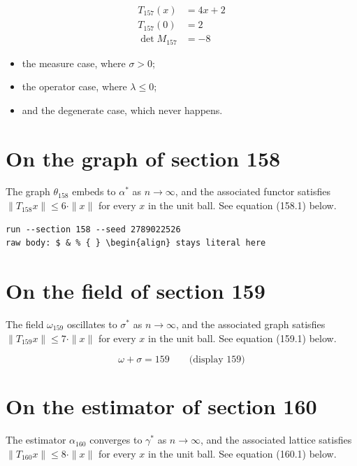 \documentclass{article}
\begin{document}
\begin{align}
T_{157}(x) &= 4 x + 2 \\
T_{157}(0) &= 2 \\
\det M_{157} &= -8
\end{align}

\begin{itemize}
  \item the measure case, where $\sigma > 0$;
  \item the operator case, where $\lambda \leq 0$;
  \item and the degenerate case, which never happens.
\end{itemize}

\section{On the graph of section 158}
The graph $\theta_{158}$ embeds to $\alpha^{*}$ as $n \to \infty$,
and the associated functor satisfies $\|T_{158} x\| \leq 6 \cdot \|x\|$
for every $x$ in the unit ball. See equation (158.1) below.

\begin{verbatim}
run --section 158 --seed 2789022526
raw body: $ & % { } \begin{align} stays literal here
\end{verbatim}

\section{On the field of section 159}
The field $\omega_{159}$ oscillates to $\sigma^{*}$ as $n \to \infty$,
and the associated graph satisfies $\|T_{159} x\| \leq 7 \cdot \|x\|$
for every $x$ in the unit ball. See equation (159.1) below.

$$
\omega + \sigma = 159 \qquad \text{(display 159)}
$$

\section{On the estimator of section 160}
The estimator $\alpha_{160}$ converges to $\gamma^{*}$ as $n \to \infty$,
and the associated lattice satisfies $\|T_{160} x\| \leq 8 \cdot \|x\|$
for every $x$ in the unit ball. See equation (160.1) below.
\end{document}
